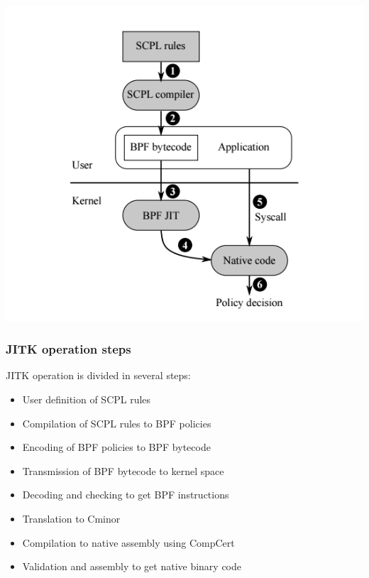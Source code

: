 \documentclass{beamer}
\begin{document}
\begin{frame}
\includegraphics[scale=0.5]{Graph2.png}
\end{frame}
\begin{frame}\frametitle{JITK operation steps}
JITK operation is divided in several steps:
\begin{itemize}[<+->]
	\item User definition of SCPL rules
	\item Compilation of SCPL rules to BPF policies
	\item Encoding of BPF policies to BPF bytecode
	\item Transmission of BPF bytecode to kernel space
	\item Decoding and checking to get BPF instructions
	\item Translation to Cminor
	\item Compilation to native assembly using CompCert
	\item Validation and assembly to get native binary code
\end{itemize}
\end{frame}
\end{document}
